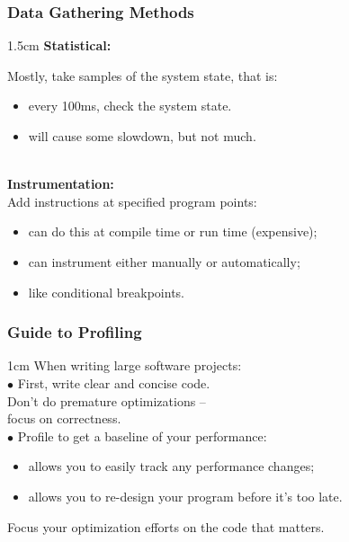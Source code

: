 \begin{frame}
  \frametitle{Data Gathering Methods}


\begin{changemargin}{1.5cm}
  {\bf Statistical:}

  Mostly, take samples of the system state, that is:
  \begin{itemize}
    \item every 100ms, check the system state.
    \item will cause some slowdown, but not much.
  \end{itemize}
~\\[1em]

  {\bf Instrumentation:}\\
  Add instructions at specified program points:
  \begin{itemize}
    \item can do this at compile time or run time (expensive);
    \item can instrument either manually or automatically;
    \item like conditional breakpoints.
  \end{itemize}
  \end{changemargin}
\end{frame}

\begin{frame}
  \frametitle{Guide to Profiling}

  

\begin{changemargin}{1cm}
  When writing large software projects:\\[1em]

     $\bullet$ First, write clear and concise code. \\
      \qquad Don't do premature optimizations -- \\
      \qquad focus on correctness.\\
     $\bullet$ Profile to get a baseline of your performance:\\[0em]
      \begin{itemize}
        \item allows you to easily track any performance changes;
        \item allows you to re-design your program before it's too late.
      \end{itemize}
  Focus your optimization efforts on the code that matters.
  \end{changemargin}
\end{frame}

